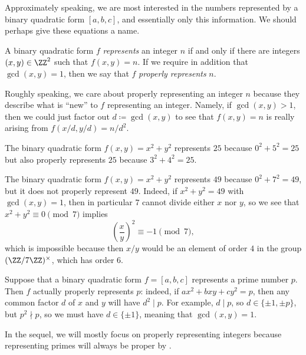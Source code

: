 \documentclass[../notes.tex]{subfiles}
\begin{document}
Approximately speaking, we are most interested in the numbers represented by a binary quadratic form $[a,b,c]$, and essentially only this information. We should perhaps give these equations a name.
\begin{definition}[represents]
	A binary quadratic form $f$ \textit{represents} an integer $n$ if and only if there are integers $(x,y)\in\ZZ^2$ such that $f(x,y)=n$. If we require in addition that $\gcd(x,y)=1$, then we say that $f$ \textit{properly represents} $n$.
\end{definition}
Roughly speaking, we care about properly representing an integer $n$ because they describe what is ``new'' to $f$ representing an integer. Namely, if $\gcd(x,y)>1$, then we could just factor out $d\coloneqq\gcd(x,y)$ to see that $f(x,y)=n$ is really arising from $f(x/d,y/d)=n/d^2$.
\begin{example}
	The binary quadratic form $f(x,y)=x^2+y^2$ represents $25$ because $0^2+5^2=25$ but also properly represents $25$ because $3^2+4^2=25$.
\end{example}
\begin{example}
	The binary quadratic form $f(x,y)=x^2+y^2$ represents $49$ because $0^2+7^2=49$, but it does not properly represent $49$. Indeed, if $x^2+y^2=49$ with $\gcd(x,y)=1$, then in particular $7$ cannot divide either $x$ nor $y$, so we see that $x^2+y^2\equiv0\pmod7$ implies
	\[\left(\frac xy\right)^2\equiv-1\pmod 7,\]
	which is impossible because then $x/y$ would be an element of order $4$ in the group $(\ZZ/7\ZZ)^\times$, which has order $6$.
\end{example}
\begin{example} \label{ex:prime-properly-represents}
	Suppose that a binary quadratic form $f=[a,b,c]$ represents a prime number $p$. Then $f$ actually properly represents $p$: indeed, if $ax^2+bxy+cy^2=p$, then any common factor $d$ of $x$ and $y$ will have $d^2\mid p$. For example, $d\mid p$, so $d\in\{\pm1,\pm p\}$, but $p^2\nmid p$, so we must have $d\in\{\pm1\}$, meaning that $\gcd(x,y)=1$.
\end{example}
In the sequel, we will mostly focus on properly representing integers because representing primes will always be proper by .
\end{document}
